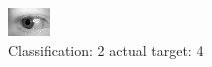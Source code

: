 \begin{figure}[h!]
\begin{center}
\includegraphics[width=0.60\columnwidth]{figures/ID716_class_2_target_4.png}
\end{center}
\caption{ Classification: 2 actual target: 4}
\label{fig:ID716_class_2_target_4}
\end{figure}
